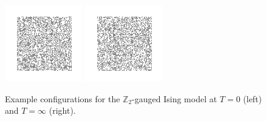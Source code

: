 \documentclass[11pt]{article}
\begin{document}
\begin{figure}[h]
    \centering
    \includegraphics[width=0.3\textwidth]{gauged_images/gauged_T=0.png}
    \includegraphics[width=0.3\textwidth]{gauged_images/gauged_T=inf.png}
    \caption{Example configurations for the $\mathbb{Z}_2$-gauged Ising model at $T=0$ (left) and $T=\infty$ (right).}
    \label{fig:GaugedExampleConfigs}
\end{figure}
\end{document}
